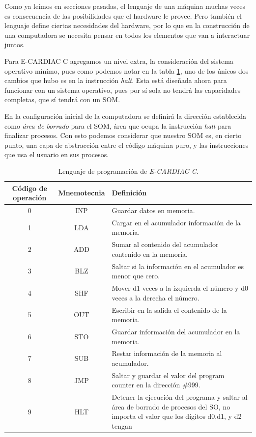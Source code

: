 \documentclass[letterpaper,12pt,oneside]{book}
\begin{document}
		Como ya leímos en secciones pasadas, el lenguaje de una máquina muchas veces es consecuencia de las posibilidades que el hardware le provee. Pero
		también el lenguaje define ciertas necesidades del hardware, por lo que en la construcción de una computadora se necesita pensar en todos
		los elementos que van a interactuar juntos. 
  
        Para E-CARDIAC C agregamos un nivel extra, la consideración del sistema operativo mínimo, pues como
		podemos notar en la tabla \ref{tab:programing_language_ecc}, uno de los únicos dos cambios que hubo es en la instrucción \textit{halt}. Esta está diseñada ahora para funcionar con un sistema operativo, pues por sí sola no tendrá las capacidades completas, que sí tendrá con un SOM.
        
        En la configuración inicial de la computadora se definirá la dirección  establecida como \textit{área de borrado} para el SOM, área que ocupa la instrucción \textit{halt} para finalizar procesos. Con esto
		podemos considerar que nuestro SOM es, en cierto punto, una capa de abstracción entre el código máquina puro, y las instrucciones que usa el usuario en sus procesos.

		
		
			\begin{table}[h]
			  \centering
			  \begin{tabular}{|c|c|p{8cm}|}
			    \hline
		    	\textbf{Código de operación} & \textbf{Mnemotecnia} & \textbf{Definición} \\
			    \hline
			    0 & INP & Guardar datos en memoria.\\
			    \hline
				1 & LDA & Cargar en el acumulador información de la memoria.\\
				\hline
			    2 & ADD & Sumar al contenido del acumulador contenido en la memoria.\\
			    \hline
			    3 & BLZ & Saltar si la información en el acumulador es menor que cero.\\
			    \hline
			    4 & SHF & Mover d1 veces a la izquierda el número y d0 veces a la derecha el número.\\
			    \hline
			    5 & OUT & Escribir en la salida el contenido de la memoria.\\
			    \hline
			    6 & STO & Guardar información del acumulador en la memoria.\\
			    \hline
			    7 & SUB & Restar información de la memoria al acumulador.\\
			    \hline
			    8 & JMP & Saltar y guardar el valor del program counter en la dirección \#999. \\
			    \hline
			    9 & HLT & Detener la ejecución del programa y saltar al área de borrado de procesos del SO, no importa el valor que los dígitos d0,d1, y d2 tengan\\
			    \hline
			  \end{tabular}
			  \caption{Lenguaje de programación de \textit{E-CARDIAC C}.}
			  \label{tab:programing_language_ecc}
			\end{table}
\end{document}
